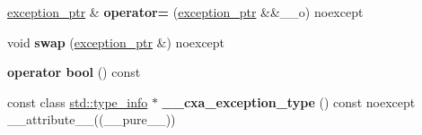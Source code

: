 \begin{DoxyCompactItemize}
\item 
\hypertarget{classstd_1_1____exception__ptr_1_1exception__ptr_a8c004ec7c8a711d3a42c97fbe569e3da}{\hyperlink{classstd_1_1____exception__ptr_1_1exception__ptr}{exception\+\_\+ptr} \& {\bfseries operator=} (\hyperlink{classstd_1_1____exception__ptr_1_1exception__ptr}{exception\+\_\+ptr} \&\&\+\_\+\+\_\+o) noexcept}\label{classstd_1_1____exception__ptr_1_1exception__ptr_a8c004ec7c8a711d3a42c97fbe569e3da}

\item 
\hypertarget{classstd_1_1____exception__ptr_1_1exception__ptr_ad2b1448af31aeebd84f37b01322ce8b8}{void {\bfseries swap} (\hyperlink{classstd_1_1____exception__ptr_1_1exception__ptr}{exception\+\_\+ptr} \&) noexcept}\label{classstd_1_1____exception__ptr_1_1exception__ptr_ad2b1448af31aeebd84f37b01322ce8b8}

\item 
\hypertarget{classstd_1_1____exception__ptr_1_1exception__ptr_aea1a685ac3dc20da791647f4437117a7}{{\bfseries operator bool} () const }\label{classstd_1_1____exception__ptr_1_1exception__ptr_aea1a685ac3dc20da791647f4437117a7}

\item 
\hypertarget{classstd_1_1____exception__ptr_1_1exception__ptr_a0d0e52fc08e9ff94e5c93952a02a42db}{const class \hyperlink{classstd_1_1type__info}{std\+::type\+\_\+info} $\ast$ {\bfseries \+\_\+\+\_\+cxa\+\_\+exception\+\_\+type} () const noexcept \+\_\+\+\_\+attribute\+\_\+\+\_\+((\+\_\+\+\_\+pure\+\_\+\+\_\+))}\label{classstd_1_1____exception__ptr_1_1exception__ptr_a0d0e52fc08e9ff94e5c93952a02a42db}

\end{DoxyCompactItemize}
